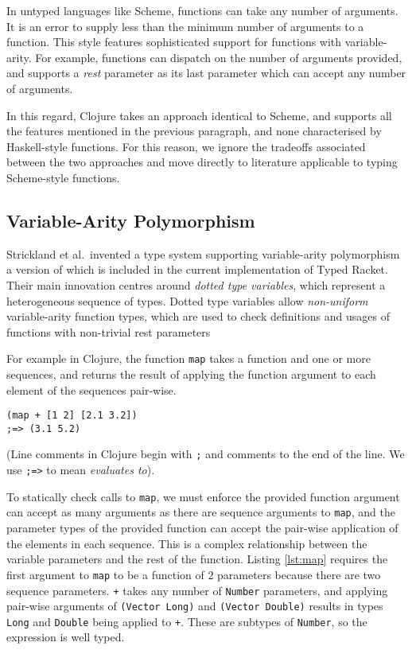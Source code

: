 In untyped languages like Scheme, functions can take any number of arguments. It is an
error to supply less than the minimum number of arguments to a function.
This style features sophisticated support for functions with variable-arity. For example,
functions can dispatch on the number of arguments provided, and supports a \emph{rest} parameter
as its last parameter which can accept any number of arguments.

In this regard, Clojure takes an approach identical to Scheme, and supports all the features
mentioned in the previous paragraph, and none characterised by Haskell-style functions.
For this reason, we ignore the tradeoffs associated between the two approaches 
and move directly to literature applicable to typing Scheme-style functions.

\subsection{Variable-Arity Polymorphism}
\label{sec:variablearity}

Strickland et al.\ invented a type system supporting variable-arity polymorphism~\cite{STF09}
a version of which is included in the current implementation of Typed Racket.
Their main innovation centres around \emph{dotted type variables}, which represent a heterogeneous sequence
of types. Dotted type variables allow \emph{non-uniform} variable-arity function types,
which are used to check definitions and usages of functions with non-trivial rest parameters

For example in Clojure, the function \lstinline|map| takes a function and one or more sequences,
and returns the result of applying the function argument to each element of the sequences pair-wise.

\begin{lstlisting}[caption=An application of the non-uniform variable-arity function \lstinline|map|, label=lst:map]
(map + [1 2] [2.1 3.2]) 
;=> (3.1 5.2)
\end{lstlisting}

(Line comments in Clojure begin with \lstinline|;| and comments to the end of the line. We use \lstinline|;=>| to mean \emph{evaluates to}).

To statically check calls to \lstinline|map|, we must enforce the provided function argument can accept as many
arguments as there are sequence arguments to \lstinline|map|, and the parameter types of the provided function can accept
the pair-wise application of the elements in each sequence. This is a complex relationship between the variable parameters and
the rest of the function.
Listing \ref{lst:map} requires the first argument to \lstinline|map| to be a function of 2 parameters because
there are two sequence parameters. \lstinline|+| takes any number of \lstinline|Number| parameters, 
and applying pair-wise arguments of \lstinline|(Vector Long)| and \lstinline|(Vector Double)| 
results in types \lstinline|Long| and \lstinline|Double| being applied to \lstinline|+|. These are subtypes
of \lstinline|Number|, so the expression is well typed.

